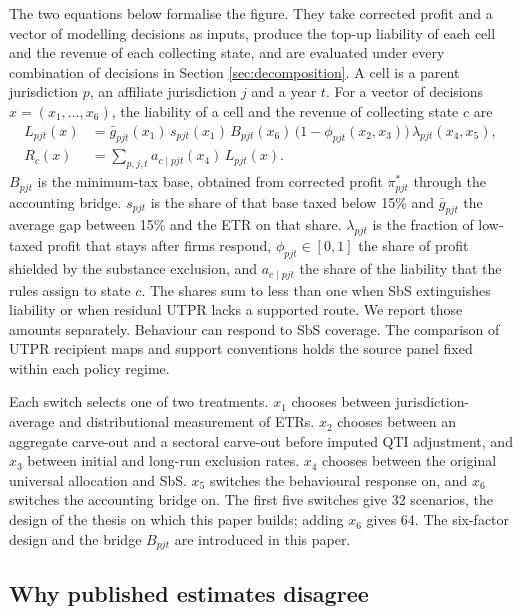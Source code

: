 \documentclass[11pt,a4paper]{article}
\begin{document}
The two equations below formalise the figure. They take corrected profit and a vector of modelling decisions as inputs, produce the top-up liability of each cell and the revenue of each collecting state, and are evaluated under every combination of decisions in Section \ref{sec:decomposition}. A cell is a parent jurisdiction $p$, an affiliate jurisdiction $j$ and a year $t$. For a vector of decisions $x=(x_1,\dots,x_6)$, the liability of a cell and the revenue of collecting state $c$ are
\begin{align}
L_{pjt}(x) &= \bar g_{pjt}(x_1)\,s_{pjt}(x_1)\,B_{pjt}(x_6)\,\bigl(1-\phi_{pjt}(x_2,x_3)\bigr)\,\lambda_{pjt}(x_4,x_5), \label{eq:liability}\\
R_c(x) &= \sum_{p,j,t} a_{c\mid pjt}(x_4)\,L_{pjt}(x). \label{eq:revenue}
\end{align}
$B_{pjt}$ is the minimum-tax base, obtained from corrected profit $\pi^{*}_{pjt}$ through the accounting bridge. $s_{pjt}$ is the share of that base taxed below 15\% and $\bar g_{pjt}$ the average gap between 15\% and the ETR on that share. $\lambda_{pjt}$ is the fraction of low-taxed profit that stays after firms respond, $\phi_{pjt}\in[0,1]$ the share of profit shielded by the substance exclusion, and $a_{c\mid pjt}$ the share of the liability that the rules assign to state $c$. The shares sum to less than one when SbS extinguishes liability or when residual UTPR lacks a supported route. We report those amounts separately. Behaviour can respond to SbS coverage. The comparison of UTPR recipient maps and support conventions holds the source panel fixed within each policy regime.

Each switch selects one of two treatments. $x_1$ chooses between jurisdiction-average and distributional measurement of ETRs. $x_2$ chooses between an aggregate carve-out and a sectoral carve-out before imputed QTI adjustment, and $x_3$ between initial and long-run exclusion rates. $x_4$ chooses between the original universal allocation and SbS. $x_5$ switches the behavioural response on, and $x_6$ switches the accounting bridge on. The first five switches give 32 scenarios, the design of the thesis on which this paper builds; adding $x_6$ gives 64. The six-factor design and the bridge $B_{pjt}$ are introduced in this paper.

\subsection{Why published estimates disagree}\label{sec:disagree}
\end{document}
